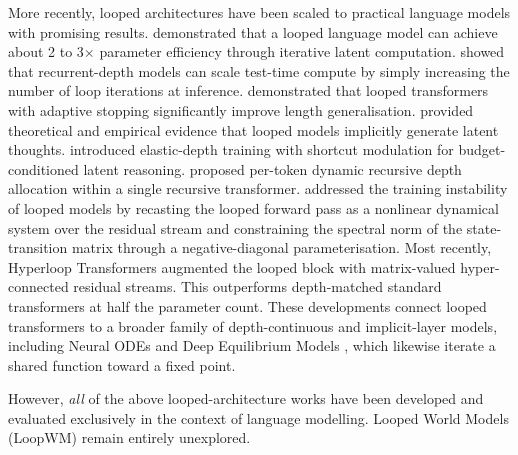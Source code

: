 \documentclass{article} %
\begin{document}
More recently, looped architectures have been scaled to practical language models with promising results. \citet{zhu2025ouro} demonstrated that a looped language model can achieve about 2 to 3$\times$ parameter efficiency through iterative latent computation. \citet{geiping2025rdm} showed that recurrent-depth models can scale test-time compute by simply increasing the number of loop iterations at inference. \citet{fan2024lengthgen} demonstrated that looped transformers with adaptive stopping significantly improve length generalisation.  \citet{saunshi2025latentthoughts} provided theoretical and empirical evidence that looped models implicitly generate latent thoughts. \citet{jeddi2025loopformer} introduced elastic-depth training with shortcut modulation for budget-conditioned latent reasoning. \citet{bae2025mor} proposed per-token dynamic recursive depth allocation within a single recursive transformer. \citet{prairie2026parcae} addressed the training instability of looped models by recasting the looped forward pass as a nonlinear dynamical system over the residual stream and constraining the spectral norm of the state-transition matrix through a negative-diagonal parameterisation. Most recently, Hyperloop Transformers \citep{zeitoun2026hyperloop} augmented the looped block with matrix-valued hyper-connected residual streams. This outperforms depth-matched standard transformers at half the parameter count. These developments connect looped transformers to a broader family of depth-continuous and implicit-layer models, including Neural ODEs \citep{chen2018neuralode} and Deep Equilibrium Models \citep{bai2019deq}, which likewise iterate a shared function toward a fixed point.

However, \emph{all} of the above looped-architecture works have been developed and evaluated exclusively in the context of language modelling. Looped World Models (LoopWM) remain entirely unexplored.
\end{document}

